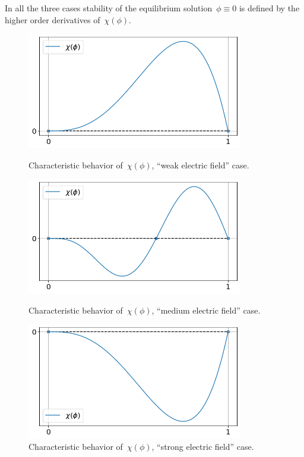 In all the three cases stability of the equilibrium solution~$\phi \equiv
0$ is defined by the higher order derivatives of~$\chi(\phi)$.

\begin{figure}[!tp]
  \centering
  \includegraphics[width=0.84\textwidth]{figures/equilibriums_case_1.png}
  \vspace{-0.3cm}
  \caption{Characteristic behavior of~$\chi(\phi)$,
    ``weak electric field'' case.}
  \label{fig:equilibriums_case_1}
  \vspace{0.7cm}
  
  \includegraphics[width=0.84\textwidth]{figures/equilibriums_case_2.png}
  \vspace{-0.3cm}
  \caption{Characteristic behavior of~$\chi(\phi)$,
    ``medium electric field'' case.}
  \label{fig:equilibriums_case_2}
  \vspace{0.7cm}
  
  \includegraphics[width=0.84\textwidth]{figures/equilibriums_case_3.png}
  \vspace{-0.3cm}
  \caption{Characteristic behavior of~$\chi(\phi)$,
    ``strong electric field'' case.}
  \label{fig:equilibriums_case_3}
\end{figure}

